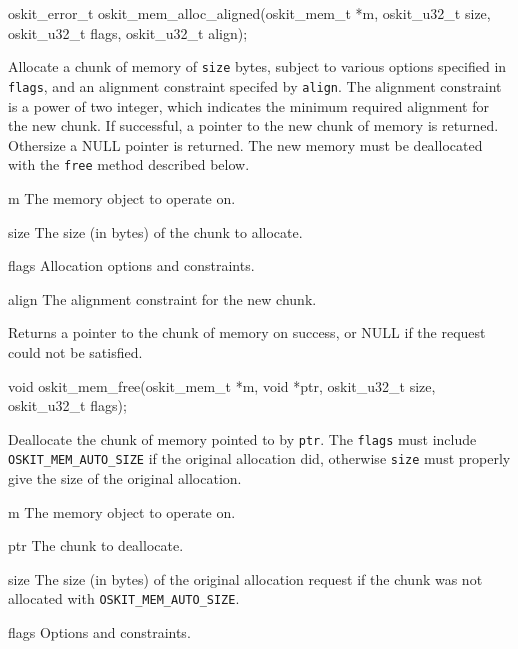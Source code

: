 \begin{apisyn}

	\funcproto oskit_error_t
		oskit_mem_alloc_aligned(oskit_mem_t *m, 
				oskit_u32_t size,
				oskit_u32_t flags, oskit_u32_t align);
\end{apisyn}
\begin{apidesc}
	Allocate a chunk of memory of \texttt{size} bytes, subject to
	various options specified in \texttt{flags}, and an alignment
	constraint specifed by \texttt{align}. The alignment constraint is
	a power of two integer, which indicates the minimum required
	alignment for the new chunk. If successful, a pointer to the new
	chunk of memory is returned. Othersize a NULL pointer is
	returned. The new memory must be deallocated with the \texttt{free}
	method described below.
\end{apidesc}
\begin{apiparm}
	\item[m]
		The memory object to operate on.
	\item[size]
		The size (in bytes) of the chunk to allocate.
	\item[flags]
		Allocation options and constraints.
	\item[align]
		The alignment constraint for the new chunk.
\end{apiparm}
\begin{apiret}
	Returns a pointer to the chunk of memory on success, or NULL if
	the request could not be satisfied.
\end{apiret}


\begin{apisyn}

	\funcproto void oskit_mem_free(oskit_mem_t *m, void *ptr,
			oskit_u32_t size, oskit_u32_t flags);
\end{apisyn}
\begin{apidesc}
	Deallocate the chunk of memory pointed to by \texttt{ptr}. The
	\texttt{flags} must include \texttt{OSKIT_MEM_AUTO_SIZE} if the
	original allocation did, otherwise \texttt{size} must properly give
	the size of the original allocation.
\end{apidesc}
\begin{apiparm}
	\item[m]
		The memory object to operate on.
	\item[ptr]
		The chunk to deallocate.
	\item[size]
		The size (in bytes) of the original allocation request if
		the chunk was not allocated with \texttt{OSKIT_MEM_AUTO_SIZE}.
	\item[flags]
		Options and constraints.
\end{apiparm}

